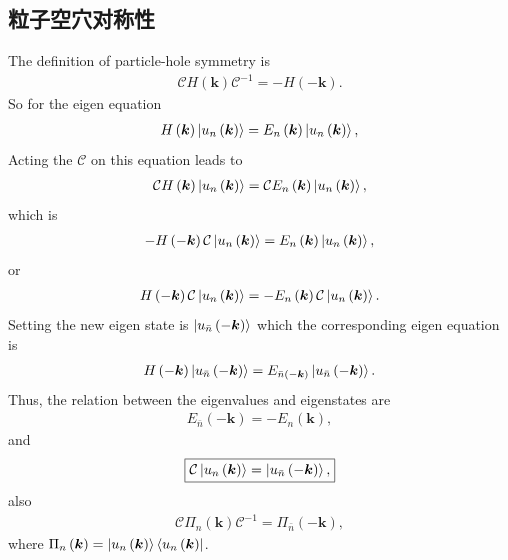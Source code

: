 \documentclass[10pt, oneside]{article}
\begin{document}
\subsection{粒子空穴对称性}
The definition of particle-hole symmetry is 
\begin{align}
	\mathcal{C} H \left(\bm{k}\right) \mathcal{C}^{-1} = - H \left(- \bm{k}\right).
\end{align}
So for the eigen equation
\begin{align}
	H \left(\bm{k}\right)  \ket{u_{n } \left(\bm{k}\right)} = E_{n} \left(\bm{k}\right) \ket{u_{n } \left(\bm{k}\right)} ,
\end{align}
Acting the \(\mathcal{C}\) on this equation leads to 
\begin{align}
	\mathcal{C}	 H \left(\bm{k}\right) \ket{u_{n } \left(\bm{k}\right)} = \mathcal{C} E_{n } \left(\bm{k}\right) \ket{u_{n } \left(\bm{k}\right)},
\end{align}
which is 
\begin{align}
	- H \left(- \bm{k}\right) \mathcal{C} \ket{u_{n } \left(\bm{k}\right)} = E_{n } \left(\bm{k}\right) \ket{u_{n } \left(\bm{k}\right)},
\end{align}
or 
\begin{align}
	H \left(- \bm{k}\right) \mathcal{C} \ket{u_{n } \left(\bm{k}\right)} = - E_{n } \left(\bm{k}\right) \mathcal{C} \ket{u_{n } \left(\bm{k}\right)}.
\end{align}
Setting the new eigen state is \(\ket{u_{\bar{n}} \left(- \bm{k}\right)}\) which the corresponding eigen equation is 
\begin{align}
	H \left(- \bm{k}\right) \ket{u_{\bar{n }} \left(-\bm{k}\right)} = E_{\bar{n } \left(-\bm{k}\right)} \ket{u_{\bar{n }} \left(-\bm{k}\right)}.		
\end{align}
Thus, the relation between the eigenvalues and eigenstates are 
\begin{align}
	\boxed{
		E_{\bar{n }} \left( - \bm{k}\right) = - E_{n } \left(\bm{k}\right),
	}
\end{align}
and
\begin{align}
	\boxed{
		\mathcal{C} \ket{u_{n } \left(\bm{k}\right)} = \ket{u_{\bar{n }} \left(- \bm{k}\right)},
	}
\end{align}
also 
\begin{align}
	 \mathcal{C} \Pi_{n } \left(\bm{k} \right) \mathcal{C}^{-1} = \Pi_{\bar{n }}  \left(- \bm{k}\right),
\end{align}
where \(\Pi_{n } \left(\bm{k}\right) = \ket{u_{n } \left(\bm{k}\right)} \bra{u_{n } \left(\bm{k}\right)}\).
\end{document}
